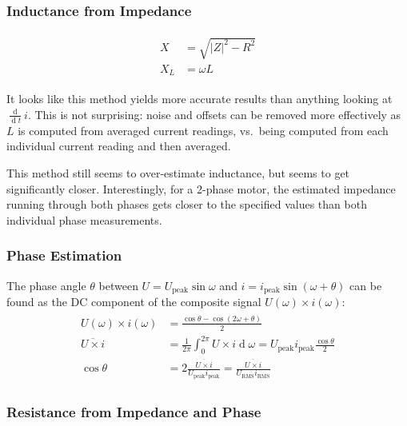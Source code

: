\documentclass[12pt,a4paper,oneside,openany]{article}
\DeclareMathOperator{\ud}{d}
\begin{document}
\subsubsection{Inductance from Impedance}

\begin{gather}
\begin{aligned}
X &= \sqrt{|Z|^2 - R^2} \\
X_L &= \omega L
\end{aligned}
\end{gather}

It looks like this method yields more accurate results than anything looking at $\frac{\ud}{\ud t} i$. This is not surprising: noise and offsets can be removed more effectively as $L$ is computed from averaged current readings, vs.\ being computed from each individual current reading and then averaged.

This method still seems to over-estimate inductance, but seems to get significantly closer. Interestingly, for a 2-phase motor, the estimated impedance running through both phases gets closer to the specified values than both individual phase measurements.

\subsubsection{Phase Estimation}

The phase angle $\theta$ between $U=U_{\textrm{peak}}\sin \omega$ and $i=i_{\textrm{peak}}\sin \left(\omega+\theta\right)$ can be found as the DC component of the composite signal $U(\omega) \times i(\omega)$:
\begin{gather}
\begin{aligned}
U(\omega) \times i(\omega) &= \frac{\cos \theta - \cos\left(2\omega+\theta\right)}{2} \\
\overline{U \times i} &= \frac{1}{2\pi}\int_0^{2\pi} U \times i \ud \omega = U_{\textrm{peak}} i_{\textrm{peak}}\frac{\cos \theta}{2} \\
\cos \theta &= 2 \frac{\overline{U \times i}}{U_{\textrm{peak}} i_{\textrm{peak}}} =\frac{\overline{U \times i}}{U_{\textrm{RMS}} i_{\textrm{RMS}}}
\end{aligned}
\end{gather}

\subsubsection{Resistance from Impedance and Phase}
\end{document}
